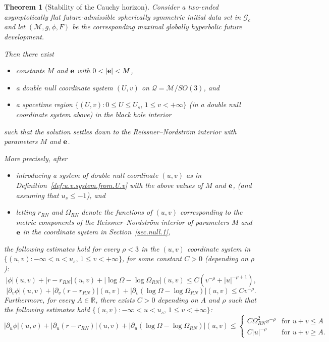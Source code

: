\documentclass[10pt, reqno]{amsart}
\newtheorem{theorem}{Theorem}[section]
\theoremstyle{definition}
\theoremstyle{remark}
\numberwithin{equation}{section}
\newcommand{\rd}{\partial}
\newcommand{\0}{\emptyset}
\newcommand{\Omg}{\Omega}
\newcommand{\bfe}{{\bf e}}
\newcommand{\calM}{\mathcal M}
\begin{document}
\begin{theorem}[Stability of the Cauchy horizon]\label{main.theorem.C0.stability}
Consider a two-ended asymptotically flat future-admissible spherically symmetric initial data set in $\mathcal G_c$ and let $(\calM, g, \phi, F)$ be the corresponding maximal globally hyperbolic future development.

Then there exist 
\begin{itemize}
\item constants $M$ and ${\bf e}$ with $0<|{\bf e}|<M$, 
\item a double null coordinate system $(U,v)$ on $\mathcal Q = \mathcal M/SO(3)$, and
\item a spacetime region $\{ (U,v): 0\leq U \leq U_s,\, 1\leq v < +\infty\}$ (in a double null coordinate system above) in the black hole interior
\end{itemize} 
such that the solution settles down to the Reissner--Nordstr\"om interior with parameters $M$ and ${\bf e}$.

More precisely, after
\begin{itemize} 
\item introducing a system of double null coordinate $(u,v)$ as in Definition~\ref{def:u.v.system.from.U.v} with the above values of $M$ and $\bfe$, (and assuming that $u_s\leq -1$), and
\item letting $r_{RN}$ and $\Omg_{RN}$ denote the functions of $(u,v)$ corresponding to the metric components of the Reissner--Nordstr\"om interior of parameters $M$ and ${\bf e}$ in the coordinate system in Section~\ref{sec.null.1},
\end{itemize}
the following estimates hold for every $\rho <3$ in the $(u,v)$ coordinate system in $\{(u,v): -\infty< u< u_s,\, 1\leq v<+\infty\}$, for some constant $C>0$ (depending on $\rho$):
$$|\phi|(u,v)+|r-r_{RN}|(u,v)+|\log\Omg-\log\Omg_{RN}|(u,v) \leq C(v^{-\rho}+|u|^{-\rho+1}),$$
$$|\rd_v\phi|(u,v)+|\rd_v(r-r_{RN})|(u,v)+|\rd_v(\log\Omg-\log\Omg_{RN})|(u,v) \leq Cv^{-\rho}.$$
Furthermore, for every $A\in \mathbb R$, there exists $C>0$ depending on $A$ and $\rho$ such that the following estimates hold $\{(u,v): -\infty< u< u_s,\, 1\leq v<+\infty\}$:
$$|\rd_u\phi|(u,v)+|\rd_u(r-r_{RN})|(u,v)+|\rd_u(\log\Omg-\log\Omg_{RN})|(u,v) \leq 
\begin{cases}
C\Omg_{RN}^2 v^{-\rho} &\mbox{for }u+v\leq A\\
C|u|^{-\rho} &\mbox{for }u+v\geq A.
\end{cases}
$$
\end{theorem}
\end{document}
